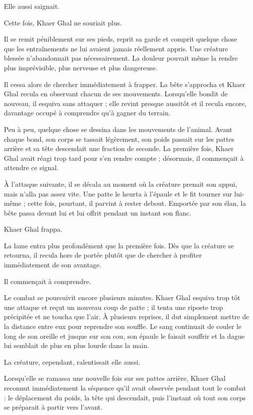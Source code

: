 Elle aussi saignait.

Cette fois, Khaer Ghal ne souriait plus.

Il se remit péniblement sur ses pieds, reprit sa garde et comprit quelque chose
que les entraînements ne lui avaient jamais réellement appris. Une créature
blessée n'abandonnait pas nécessairement. La douleur pouvait même la rendre
plus imprévisible, plus nerveuse et plus dangereuse.

Il cessa alors de chercher immédiatement à frapper. La bête s'approcha et Khaer
Ghal recula en observant chacun de ses mouvements. Lorsqu'elle bondit de
nouveau, il esquiva sans attaquer ; elle revint presque aussitôt et il recula
encore, davantage occupé à comprendre qu'à gagner du terrain.

Peu à peu, quelque chose se dessina dans les mouvements de l'animal. Avant
chaque bond, son corps se tassait légèrement, son poids passait sur les pattes
arrière et sa tête descendait une fraction de seconde. La première fois, Khaer
Ghal avait réagi trop tard pour s'en rendre compte ; désormais, il commençait à
attendre ce signal.

À l'attaque suivante, il se décala au moment où la créature prenait son appui,
mais n'alla pas assez vite. Une patte le heurta à l'épaule et le fit tourner
sur lui-même ; cette fois, pourtant, il parvint à rester debout. Emportée par
son élan, la bête passa devant lui et lui offrit pendant un instant son flanc.

Khaer Ghal frappa.

La lame entra plus profondément que la première fois. Dès que la créature se
retourna, il recula hors de portée plutôt que de chercher à profiter
immédiatement de son avantage.

Il commençait à comprendre.

Le combat se poursuivit encore plusieurs minutes. Khaer Ghal esquiva trop tôt
une attaque et reçut un nouveau coup de patte ; il tenta une riposte trop
précipitée et ne toucha que l'air. À plusieurs reprises, il dut simplement
mettre de la distance entre eux pour reprendre son souffle. Le sang continuait
de couler le long de son oreille et jusque sur son cou, son épaule le faisait
souffrir et la dague lui semblait de plus en plus lourde dans la main.

La créature, cependant, ralentissait elle aussi.

Lorsqu'elle se ramassa une nouvelle fois sur ses pattes arrière, Khaer Ghal
reconnut immédiatement la séquence qu'il avait observée pendant tout le combat :
le déplacement du poids, la tête qui descendait, puis l'instant où tout son
corps se préparait à partir vers l'avant.

